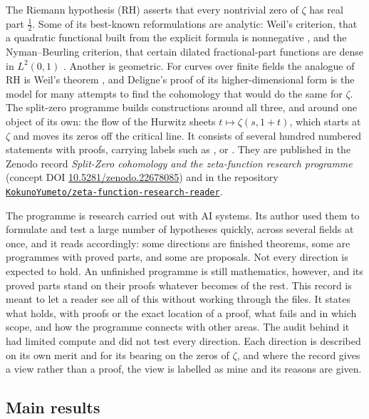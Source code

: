 The Riemann hypothesis (RH) asserts that every nontrivial zero of $\zeta$ has real part $\tfrac12$. Some of its best-known reformulations are analytic: Weil's criterion, that a quadratic functional built from the explicit formula is nonnegative \cite{Weil,Bombieri}, and the Nyman--Beurling criterion, that certain dilated fractional-part functions are dense in $L^2(0,1)$ \cite{Beurling,BaezDuarte}. Another is geometric. For curves over finite fields the analogue of RH is Weil's theorem \cite{Weil1948,Rosen}, and Deligne's proof of its higher-dimensional form \cite{DeligneWeilII} is the model for many attempts to find the cohomology that would do the same for $\zeta$.
The split-zero programme builds constructions around all three, and around one object of its own: the flow of the Hurwitz sheets $t\mapsto\zeta(s,1+t)$, which starts at $\zeta$ and moves its zeros off the critical line.
It consists of several hundred numbered statements with proofs, carrying labels such as ,  or . They are published in the Zenodo record \emph{Split-Zero cohomology and the zeta-function research programme} (concept DOI \href{https://doi.org/10.5281/zenodo.22678085}{10.5281/zenodo.22678085}) and in the repository \href{https://github.com/KokunoYumeto/zeta-function-research-reader}{\texttt{KokunoYumeto/\allowbreak zeta-function-\allowbreak research-reader}}.

The programme is research carried out with AI systems. Its author used them to formulate and test a large number of hypotheses quickly, across several fields at once, and it reads accordingly: some directions are finished theorems, some are programmes with proved parts, and some are proposals.
Not every direction is expected to hold. An unfinished programme is still mathematics, however, and its proved parts stand on their proofs whatever becomes of the rest.
This record is meant to let a reader see all of this without working through the files. It states what holds, with proofs or the exact location of a proof, what fails and in which scope, and how the programme connects with other areas. The audit behind it had limited compute and did not test every direction. Each direction is described on its own merit and for its bearing on the zeros of $\zeta$, and where the record gives a view rather than a proof, the view is labelled as mine and its reasons are given.

\subsection*{Main results}

